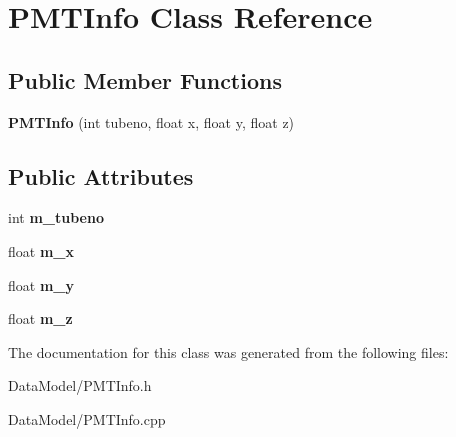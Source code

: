 \hypertarget{classPMTInfo}{\section{P\-M\-T\-Info Class Reference}
\label{classPMTInfo}
}
\subsection*{Public Member Functions}
\begin{DoxyCompactItemize}
\item 
\hypertarget{classPMTInfo_a46318641774fe21018e07b4416f2648e}{{\bfseries P\-M\-T\-Info} (int tubeno, float x, float y, float z)}\label{classPMTInfo_a46318641774fe21018e07b4416f2648e}

\end{DoxyCompactItemize}
\subsection*{Public Attributes}
\begin{DoxyCompactItemize}
\item 
\hypertarget{classPMTInfo_a573f237c93ab1e7e6949a4f70d63f49e}{int {\bfseries m\-\_\-tubeno}}\label{classPMTInfo_a573f237c93ab1e7e6949a4f70d63f49e}

\item 
\hypertarget{classPMTInfo_ad6c7d488f214e32d0f8ce68785238c8e}{float {\bfseries m\-\_\-x}}\label{classPMTInfo_ad6c7d488f214e32d0f8ce68785238c8e}

\item 
\hypertarget{classPMTInfo_aed9a6e7cd9a1caa2fcaeceb861898e0f}{float {\bfseries m\-\_\-y}}\label{classPMTInfo_aed9a6e7cd9a1caa2fcaeceb861898e0f}

\item 
\hypertarget{classPMTInfo_aff95f0c2b0dfaa30262c82cc5eb17a06}{float {\bfseries m\-\_\-z}}\label{classPMTInfo_aff95f0c2b0dfaa30262c82cc5eb17a06}

\end{DoxyCompactItemize}


The documentation for this class was generated from the following files\-:\begin{DoxyCompactItemize}
\item 
Data\-Model/P\-M\-T\-Info.\-h\item 
Data\-Model/P\-M\-T\-Info.\-cpp\end{DoxyCompactItemize}
